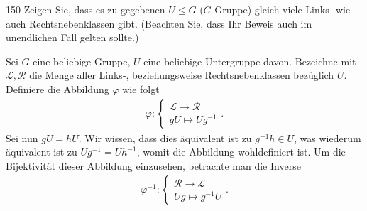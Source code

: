\begin{algebraUE}{150}
Zeigen Sie, dass es zu gegebenen $U \leq G$ ($G$ Gruppe) gleich viele Links-
wie auch Rechtsnebenklassen gibt. (Beachten Sie, dass Ihr Beweis auch im unendlichen
Fall gelten sollte.)
\end{algebraUE}
\begin{solution}
Sei $G$ eine beliebige Gruppe, $U$ eine beliebige Untergruppe davon.
Bezeichne mit $\mathcal{L},\mathcal{R}$ die Menge
aller Links-, beziehungsweise Rechtsnebenklassen bezüglich $U$.
Definiere die Abbildung $\varphi$ wie folgt
\begin{align*}
  \varphi: \begin{cases}
    \mathcal{L} \rightarrow \mathcal{R} \\
    gU \mapsto Ug^{-1}
  \end{cases}.
\end{align*}
Sei nun $gU = hU$. Wir wissen, dass dies äquivalent ist zu $g^{-1}h \in U$,
was wiederum äquivalent ist zu $Ug^{-1} = Uh^{-1}$, womit die Abbildung
wohldefiniert ist.
Um die Bijektivität dieser Abbildung einzusehen, betrachte man die Inverse
\begin{align*}
  \varphi^{-1}: \begin{cases}
    \mathcal{R} \rightarrow \mathcal{L} \\
    Ug \mapsto g^{-1}U
  \end{cases}.
\end{align*}
\end{solution}
